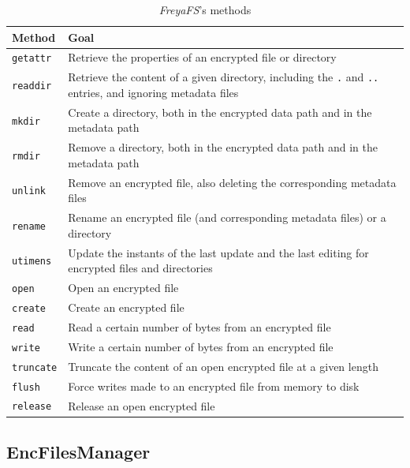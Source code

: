 \documentclass[a4paper,12pt,twoside,openright]{report}
\begin{document}
  \begin{table}[h!]
    \centering
    \begin{tabular}{|p{3cm}|p{11cm}|} 
      \hline
      Method & Goal \\ [0.5ex] 
      \hline\hline
      \texttt{getattr} & Retrieve the properties of an encrypted file or directory \\ 
      \hline
      \texttt{readdir} & Retrieve the content of a given directory, including the \texttt{.} and \texttt{..} entries, and ignoring metadata files \\
      \hline
      \texttt{mkdir} & Create a directory, both in the encrypted data path and in the metadata path \\
      \hline
      \texttt{rmdir} & Remove a directory, both in the encrypted data path and in the metadata path \\
      \hline
      \texttt{unlink} & Remove an encrypted file, also deleting the corresponding metadata files \\
      \hline
      \texttt{rename} & Rename an encrypted file (and corresponding metadata files) or a directory \\
      \hline
      \texttt{utimens} & Update the instants of the last update and the last editing for encrypted files and directories \\
      \hline
      \texttt{open} & Open an encrypted file \\
      \hline
      \texttt{create} & Create an encrypted file \\
      \hline
      \texttt{read} & Read a certain number of bytes from an encrypted file \\
      \hline
      \texttt{write} & Write a certain number of bytes from an encrypted file \\
      \hline
      \texttt{truncate} & Truncate the content of an open encrypted file at a given length \\
      \hline
      \texttt{flush} & Force writes made to an encrypted file from memory to disk \\
      \hline
      \texttt{release} & Release an open encrypted file \\
      \hline
    \end{tabular}
    \caption{\textit{FreyaFS}'s methods}
    \label{table-freyafs}
  \end{table}

  \subsection{EncFilesManager}
  \label{enc-files-manager}
\end{document}
